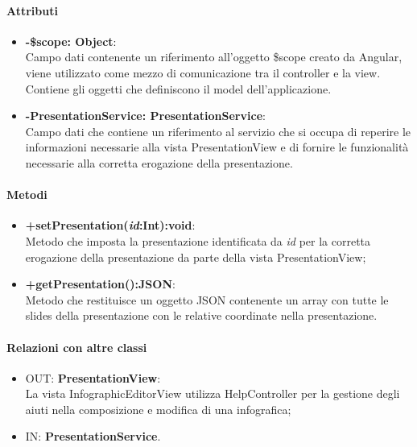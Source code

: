 	\paragraph{Attributi}
	\begin{itemize}
		\item \textbf{-\$scope: Object}:\\
			Campo dati contenente un riferimento all'oggetto \$scope creato da Angular, viene utilizzato come mezzo di comunicazione tra il controller e la view. Contiene gli oggetti che definiscono il model dell'applicazione.
		\item \textbf{-PresentationService: PresentationService}:\\
			Campo dati che contiene un riferimento al servizio che si occupa di reperire le informazioni necessarie alla vista PresentationView e di fornire le funzionalità necessarie alla corretta erogazione della presentazione.
	\end{itemize}
	
	\paragraph{Metodi}
	\begin{itemize}
	  \item \textbf{+setPresentation(\textit{id}:Int):void}:\\
		  Metodo che imposta la presentazione identificata da  \textit{id} per la corretta erogazione della presentazione da parte della vista PresentationView;
	  \item \textbf{+getPresentation():JSON}:\\
		  Metodo che restituisce un oggetto JSON contenente un array con tutte le slides della presentazione con le relative coordinate nella presentazione.
		  
	\end{itemize}
	\paragraph{Relazioni con altre classi}
	\begin{itemize}
	  \item OUT: \textbf{PresentationView}:\\
		La vista InfographicEditorView utilizza HelpController per la gestione degli aiuti nella composizione e modifica di una infografica;	
	  \item IN: \textbf{PresentationService}.
	\end{itemize}
	
